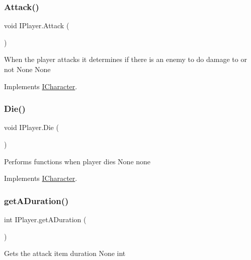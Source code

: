 \subsubsection{\texorpdfstring{Attack()}{Attack()}}
{\footnotesize\ttfamily void I\+Player.\+Attack (\begin{DoxyParamCaption}{ }\end{DoxyParamCaption})\hspace{0.3cm}{\ttfamily [inline]}}

When the player attacks it determines if there is an enemy to do damage to or not  None  None 

Implements \mbox{\hyperlink{interface_i_character}{I\+Character}}.

\mbox{\label{class_i_player_a62499ee0288916e1220f64e18653c7b7}} 
\subsubsection{\texorpdfstring{Die()}{Die()}}
{\footnotesize\ttfamily void I\+Player.\+Die (\begin{DoxyParamCaption}{ }\end{DoxyParamCaption})\hspace{0.3cm}{\ttfamily [inline]}}

Performs functions when player dies  None  none 

Implements \mbox{\hyperlink{interface_i_character_ad58356e457f98d8a6f9548da446012ce}{I\+Character}}.

\mbox{\label{class_i_player_a81cb512517a08129c77e730c114c5f98}} 
\subsubsection{\texorpdfstring{get\+A\+Duration()}{getADuration()}}
{\footnotesize\ttfamily int I\+Player.\+get\+A\+Duration (\begin{DoxyParamCaption}{ }\end{DoxyParamCaption})\hspace{0.3cm}{\ttfamily [inline]}}

Gets the attack item duration  None  int \mbox{\label{class_i_player_aaf464871461953c9a35faac73a0d054f}} 
